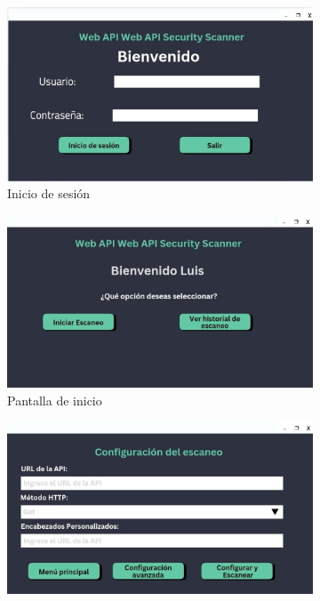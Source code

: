 \documentclass{article}
\begin{document}
    \begin{figure}[ht]
        \centering
        \begin{subfigure}[b]{0.35\textwidth}
            \centering
            \includegraphics[width=\textwidth]{Demo8.jpg}
            \caption{Inicio de sesión}
        \end{subfigure}
        \begin{subfigure}[b]{0.35\textwidth}
            \centering
            \includegraphics[width=\textwidth]{Demo7.jpg}
            \caption{Pantalla de inicio}
        \end{subfigure}
        \begin{subfigure}[b]{0.35\textwidth}
            \centering
            \includegraphics[width=\textwidth]{Demo6.jpg}

\end{subfigure}
\end{figure}
\end{document}
